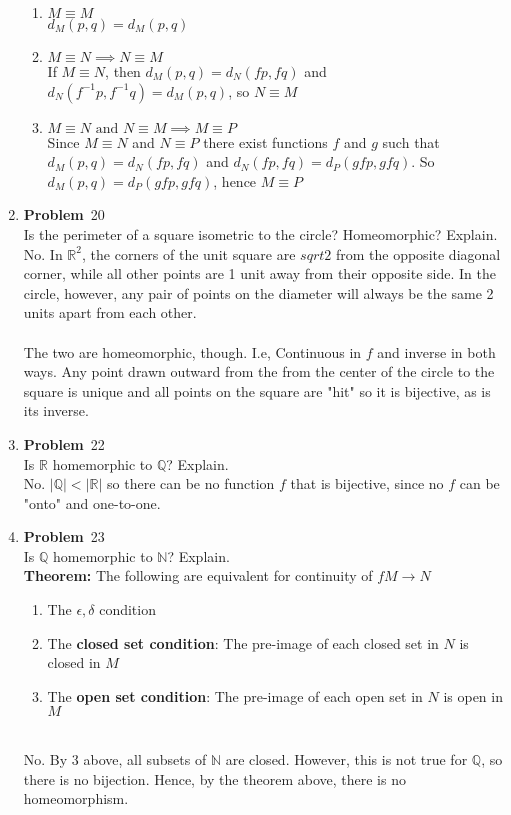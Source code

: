 \documentclass[12pt]{amsart}
\newcommand{\benu}{\begin{enumerate}}
\newcommand{\eenu}{\end{enumerate}}
\theoremstyle{definition}
\newcommand{\mbR}{\mathbb{R}}
\newcommand{\mbN}{\mathbb{N}}
\newcommand{\mbQ}{\mathbb{Q}}
\newcommand{\itep}{\item {\bfseries Problem}\ }
\begin{document}
\begin{enumerate}[series=p]
\benu
\item $M \equiv M$\\
$d_M(p,q) = d_M(p,q)$
\item $M \equiv N \implies N \equiv M$\\
If $M \equiv N$, then $d_M(p,q) = d_N(fp, fq)$ and $d_N(f^{-1}p, f^{-1}q) = d_M(p,q)$, so $N \equiv M$
\item $M \equiv N \text{ and }  N \equiv M \implies M \equiv P$\\
Since $M \equiv N$ and $N \equiv P$ there exist functions $f$ and $g$ such that $d_M(p,q) = d_N(fp, fq)$ and $d_N(fp, fq) = d_P(gfp, gfq)$.  So $d_M(p,q) =  d_P(gfp, gfq)$, hence $M \equiv P$
\eenu
\newpage

\itep 20\\
Is the perimeter of a square isometric to the circle?  Homeomorphic?  Explain.\\
No.  In $\mbR^2$, the corners of the unit square are $sqrt{2}$ from the opposite diagonal corner, while all other points are 1 unit away from their opposite side.  In the circle, however, any pair of points on the diameter will always be the same 2 units apart from each other.\\
\\
The two are homeomorphic, though.  I.e, Continuous in $f$ and inverse in both ways.  Any point drawn outward from the from the center of the circle to the square is unique and all points on the square are "hit" so it is bijective, as is its inverse.
\newpage

\itep 22\\
Is $\mbR$ homemorphic to $\mbQ$?  Explain.\\
No.  $|\mbQ| < |\mbR|$ so there can be no function $f$ that is bijective, since no $f$ can be "onto" and one-to-one.
\newpage

\itep 23\\
Is $\mbQ$ homemorphic to $\mbN$?  Explain.\\
\textbf{Theorem:} The following are equivalent for continuity of $fM \to N$
\benu
\item The $\epsilon, \delta$ condition
\item The \textbf{closed set condition}: The pre-image of each closed set in $N$ is closed in $M$
\item The \textbf{open set condition}: The pre-image of each open set in $N$ is open in $M$
\eenu
\leavevmode \\
No.  By 3 above, all subsets of $\mbN$ are closed.  However, this is not true for $\mbQ$, so there is no bijection.  Hence, by the theorem above, there is no homeomorphism.
\newpage


\end{enumerate}
\end{document}
